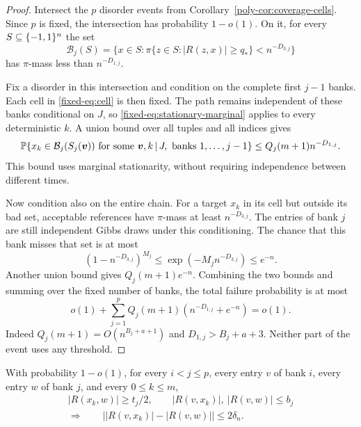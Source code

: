\begin{proof}
Intersect the $p$ disorder events from
Corollary~\ref{poly-cor:coverage-cells}. Since $p$ is fixed, the
intersection has probability $1-o(1)$. On it, for every $S\subseteq\{-1,1\}^n$
the set
\[
 \mathcal B_j(S)=
 \{x\in S: \pi\{z\in S:|R(z,x)|\ge q_*\}<n^{-D_{3,j}}\}
\]
has $\pi$-mass less than $n^{-D_{1,j}}$.

Fix a disorder in this intersection and condition on the complete first
$j-1$ banks. Each cell in \eqref{fixed-eq:cell} is then fixed. The path
remains independent of these banks conditional on $J$, so
\eqref{fixed-eq:stationary-marginal} applies to every deterministic
$k$. A union bound over all tuples and all indices gives
\begin{equation}\label{fixed-eq:bad-target-bound}
 \mathbb P\!\left\{
 x_k\in\mathcal B_j(S_j(\boldsymbol v))
 \text{ for some }\boldsymbol v,k
 \,\middle|\, J,\text{ banks }1,\ldots,j-1\right\}
 \le Q_j(m+1)n^{-D_{1,j}}.
\end{equation}
This bound uses marginal stationarity, without requiring independence
between different times.

Now condition also on the entire chain. For a target $x_k$ in its cell
but outside its bad set, acceptable references have $\pi$-mass at least
$n^{-D_{3,j}}$. The entries of bank $j$ are still independent Gibbs
draws under this conditioning. The chance that this bank misses that
set is at most
\[
 (1-n^{-D_{3,j}})^{M_j}
 \le\exp(-M_jn^{-D_{3,j}})\le e^{-n}.
\]
Another union bound gives $Q_j(m+1)e^{-n}$. Combining the two bounds
and summing over the fixed number of banks, the total failure
probability is at most
\begin{equation}\label{fixed-eq:coverage-failure}
 o(1)+\sum_{j=1}^pQ_j(m+1)
              (n^{-D_{1,j}}+e^{-n})=o(1).
\end{equation}
Indeed $Q_j(m+1)=O(n^{B_j+a+1})$ and
$D_{1,j}>B_j+a+3$. Neither part of the event uses any threshold.
\end{proof}

\begin{lemma}
\label{fixed-lem:bank-locking}
With probability $1-o(1)$, for every $i<j\le p$, every entry $v$ of
bank $i$, every entry $w$ of bank $j$, and every $0\le k\le m$,
\begin{equation}\label{fixed-eq:all-bank-locking}
 \begin{gathered}
 |R(x_k,w)|\ge t_j/2,\qquad
 |R(v,x_k)|,\ |R(v,w)|\le b_j
 \\
 \Longrightarrow\qquad
 \bigl||R(v,x_k)|-|R(v,w)|\bigr|\le2\delta_n.
 \end{gathered}
\end{equation}
\end{lemma}

